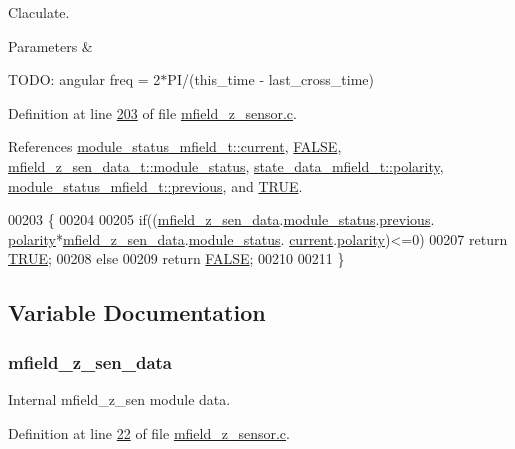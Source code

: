 Claculate. 


\begin{DoxyParams}{Parameters}
{\em } & \\
\hline
\end{DoxyParams}
T\+O\+D\+O\+: angular freq = 2$\ast$\+P\+I/(this\+\_\+time -\/ last\+\_\+cross\+\_\+time) 

Definition at line \hyperlink{a00053_source_l00203}{203} of file \hyperlink{a00053_source}{mfield\+\_\+z\+\_\+sensor.\+c}.



References \hyperlink{a00019_source_l00108}{module\+\_\+status\+\_\+mfield\+\_\+t\+::current}, \hyperlink{a00040_source_l00086}{F\+A\+L\+S\+E}, \hyperlink{a00027_source_l00047}{mfield\+\_\+z\+\_\+sen\+\_\+data\+\_\+t\+::module\+\_\+status}, \hyperlink{a00019_source_l00104}{state\+\_\+data\+\_\+mfield\+\_\+t\+::polarity}, \hyperlink{a00019_source_l00110}{module\+\_\+status\+\_\+mfield\+\_\+t\+::previous}, and \hyperlink{a00040_source_l00084}{T\+R\+U\+E}.


\begin{DoxyCode}
00203                               \{
00204 
00205     \textcolor{keywordflow}{if}((\hyperlink{a00053_ae42bea09c571df9fad890518725d5cf4}{mfield\_z\_sen\_data}.\hyperlink{a00027_adfab5a5d8b45a93dfb13edb24e2b80e3}{module\_status}.\hyperlink{a00019_adcb859b2f3983a9c58deab28e59c333f}{previous}.
      \hyperlink{a00019_a45152a3cd909463d7c924c30b575a073}{polarity}*\hyperlink{a00053_ae42bea09c571df9fad890518725d5cf4}{mfield\_z\_sen\_data}.\hyperlink{a00027_adfab5a5d8b45a93dfb13edb24e2b80e3}{module\_status}.
      \hyperlink{a00019_acf41ffc11da291c2f9f0fcb02ee72b98}{current}.\hyperlink{a00019_a45152a3cd909463d7c924c30b575a073}{polarity})<=0)
00207     \textcolor{keywordflow}{return} \hyperlink{a00040_aa8cecfc5c5c054d2875c03e77b7be15d}{TRUE};
00208     \textcolor{keywordflow}{else}
00209     \textcolor{keywordflow}{return} \hyperlink{a00040_aa93f0eb578d23995850d61f7d61c55c1}{FALSE};
00210 
00211 \}
\end{DoxyCode}


\subsection{Variable Documentation}
\hypertarget{a00027_ae42bea09c571df9fad890518725d5cf4}{
\subsubsection[{mfield\+\_\+z\+\_\+sen\+\_\+data}]{ mfield\+\_\+z\+\_\+sen\+\_\+data}}\label{a00027_ae42bea09c571df9fad890518725d5cf4}


Internal mfield\+\_\+z\+\_\+sen module data. 



Definition at line \hyperlink{a00053_source_l00022}{22} of file \hyperlink{a00053_source}{mfield\+\_\+z\+\_\+sensor.\+c}.

